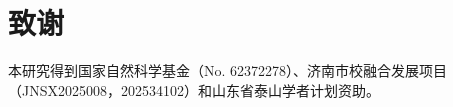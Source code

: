 \documentclass[preprint,10pt,authoryear]{elsarticle}
\begin{document}










\section{致谢}
\label{sec:Acknowledgments}
本研究得到国家自然科学基金（No. 62372278）、济南市校融合发展项目（JNSX2025008，202534102）和山东省泰山学者计划资助。


 
    
\end{document}
